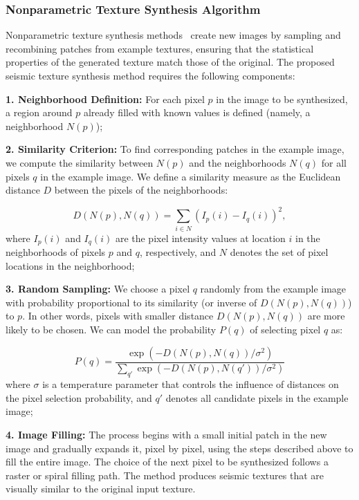 \documentclass{ieeeaccess}
\begin{document}
\subsubsection{Nonparametric Texture Synthesis Algorithm}

Nonparametric texture synthesis methods~\cite{Efros1999} create new images by sampling and recombining patches from example textures, ensuring that the statistical properties of the generated texture match those of the original. The proposed seismic texture synthesis method requires the following components:

\textbf{1. Neighborhood Definition:} For each pixel $p$ in the image to be synthesized, a region around $p$ already filled with known values is defined (namely, a neighborhood $N(p)$);

\textbf{2. Similarity Criterion:} To find corresponding patches in the example image, we compute the similarity between $N(p)$ and the neighborhoods $N(q)$ for all pixels $q$ in the example image. We define a similarity measure as the Euclidean distance $D$ between the pixels of the neighborhoods:

\begin{equation}
D(N(p), N(q)) = \sum_{i \in N} \left( I_p(i) - I_q(i) \right)^2,
\end{equation}
where $I_p(i)$ and $I_q(i)$ are the pixel intensity values at location $i$ in the neighborhoods of pixels $p$ and $q$, respectively, and $N$ denotes the set of pixel locations in the neighborhood;

\textbf{3. Random Sampling:} We choose a pixel $q$ randomly from the example image with probability proportional to its similarity (or inverse of $D(N(p), N(q))$) to $p$. In other words, pixels with smaller distance $D(N(p), N(q))$ are more likely to be chosen. We can model the probability $P(q)$ of selecting pixel $q$ as:

\begin{equation}
P(q) = \frac{\exp(-D(N(p), N(q)) / \sigma^2)}{\sum_{q'} \exp(-D(N(p), N(q')) / \sigma^2)}
\end{equation}
where $\sigma$ is a temperature parameter that controls the influence of distances on the pixel selection probability, and $q'$ denotes all candidate pixels in the example image;

\textbf{4. Image Filling:} The process begins with a small initial patch in the new image and gradually expands it, pixel by pixel, using the steps described above to fill the entire image. The choice of the next pixel to be synthesized follows a raster or spiral filling path. The method produces seismic textures that are visually similar to the original input texture. 
\end{document}
